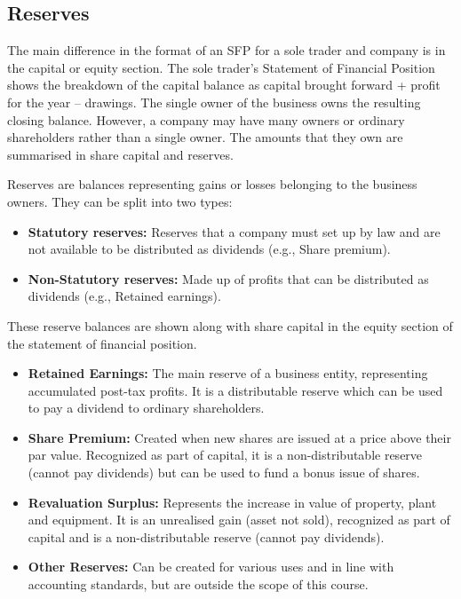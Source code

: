\subsection{Reserves}

The main difference in the format of an SFP for a sole trader and company is in the capital or equity section.
The sole trader's Statement of Financial Position shows the breakdown of the capital balance as capital brought forward + profit for the year – drawings. The single owner of the business owns the resulting closing balance.
However, a company may have many owners or ordinary shareholders rather than a single owner. The amounts that they own are summarised in share capital and reserves.

Reserves are balances representing gains or losses belonging to the business owners. They can be split into two types:
\begin{itemize}
    \item \textbf{Statutory reserves:} Reserves that a company must set up by law and are not available to be distributed as dividends (e.g., Share premium).
    \item \textbf{Non-Statutory reserves:} Made up of profits that can be distributed as dividends (e.g., Retained earnings).
\end{itemize}
These reserve balances are shown along with share capital in the equity section of the statement of financial position.

\begin{itemize}
    \item \textbf{Retained Earnings:} The main reserve of a business entity, representing accumulated post-tax profits. It is a distributable reserve which can be used to pay a dividend to ordinary shareholders.
    \item \textbf{Share Premium:} Created when new shares are issued at a price above their par value. Recognized as part of capital, it is a non-distributable reserve (cannot pay dividends) but can be used to fund a bonus issue of shares.
    \item \textbf{Revaluation Surplus:} Represents the increase in value of property, plant and equipment. It is an unrealised gain (asset not sold), recognized as part of capital and is a non-distributable reserve (cannot pay dividends).
    \item \textbf{Other Reserves:} Can be created for various uses and in line with accounting standards, but are outside the scope of this course.
\end{itemize}

